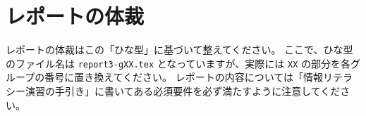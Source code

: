\section{レポートの体裁}
レポートの体裁はこの「ひな型」に基づいて整えてください。
ここで、ひな型のファイル名は \verb+report3-gXX.tex+ となっていますが、実際には
 \verb+XX+ の部分を各グループの番号に置き換えてください。
レポートの内容については「情報リテラシー演習の手引き」に書いてある必須要件を必ず満たすように注意してください。
